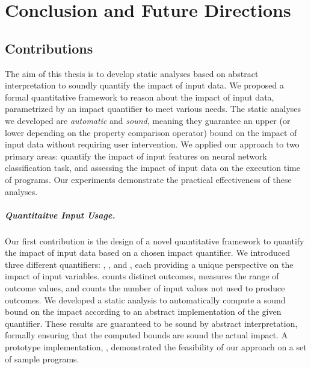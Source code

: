 

\chapter{Conclusion and Future Directions}

\section*{Contributions}


The aim of this thesis is to develop static analyses based on abstract interpretation to soundly quantify the impact of input data.
We proposed a formal quantitative framework to reason about the impact of input data, parametrized by an impact quantifier to meet various needs.
The static analyses we developed are \emph{automatic} and \emph{sound}, meaning they guarantee an upper (or lower depending on the property comparison operator) bound on the impact of input data without requiring user intervention.
We applied our approach to two primary areas: quantify the impact of input features on neural network classification task, and assessing the impact of input data on the execution time of programs.
Our experiments demonstrate the practical effectiveness of these analyses.

\paragraph{Quantitaitve Input Usage.} Our first contribution is the design of a novel quantitative framework to quantify the impact of input data based on a chosen impact quantifier.
We introduced three different quantifiers: \outcomesname{}, \rangename{}, and \qusedname{}, each providing a unique perspective on the impact of input variables.
\outcomesname{} counts distinct outcomes, \rangename{} measures the range of outcome values, and \qusedname{} counts the number of input values not used to produce outcomes.
We developed a static analysis to automatically compute a sound bound on the impact according to an abstract implementation of the given quantifier.
These results are guaranteed to be sound by abstract interpretation, formally ensuring that the computed bounds are sound \wrt{} the actual impact.
A prototype implementation, \impatto,\sidenote{\impattourl} demonstrated the feasibility of our approach on a set of sample programs.

